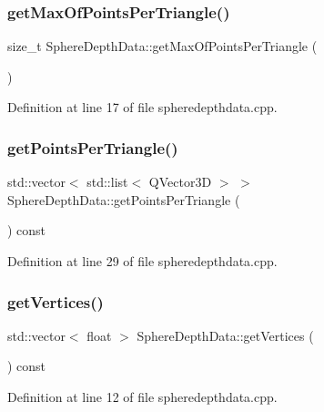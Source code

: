 \subsubsection{\texorpdfstring{get\+Max\+Of\+Points\+Per\+Triangle()}{getMaxOfPointsPerTriangle()}}
{\footnotesize\ttfamily size\+\_\+t Sphere\+Depth\+Data\+::get\+Max\+Of\+Points\+Per\+Triangle (\begin{DoxyParamCaption}{ }\end{DoxyParamCaption})}



Definition at line 17 of file spheredepthdata.\+cpp.

\mbox{\label{struct_sphere_depth_data_af42bd1ede7948a735367755a61148adc}} 
\subsubsection{\texorpdfstring{get\+Points\+Per\+Triangle()}{getPointsPerTriangle()}}
{\footnotesize\ttfamily std\+::vector$<$ std\+::list$<$ Q\+Vector3D $>$ $>$ Sphere\+Depth\+Data\+::get\+Points\+Per\+Triangle (\begin{DoxyParamCaption}{ }\end{DoxyParamCaption}) const}



Definition at line 29 of file spheredepthdata.\+cpp.

\mbox{\label{struct_sphere_depth_data_adab658de163c515ec9a41a70300a0af9}} 
\subsubsection{\texorpdfstring{get\+Vertices()}{getVertices()}}
{\footnotesize\ttfamily std\+::vector$<$ float $>$ Sphere\+Depth\+Data\+::get\+Vertices (\begin{DoxyParamCaption}{ }\end{DoxyParamCaption}) const}



Definition at line 12 of file spheredepthdata.\+cpp.


